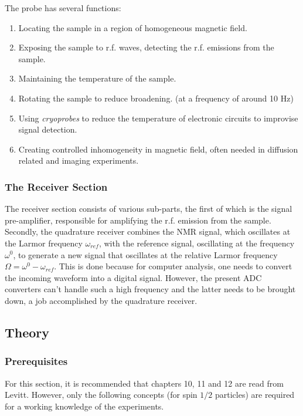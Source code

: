 		The probe has several functions:
		\begin{enumerate}
		\item Locating the sample in a region of homogeneous magnetic field.
		\item Exposing the sample to r.f. waves, detecting the r.f. emissions from
		the sample.
		\item Maintaining the temperature of the sample.
		\item Rotating the sample to reduce broadening. (at a frequency of around
		10 Hz)
		\item Using \emph{cryoprobes} to reduce the temperature of electronic circuits
		to improvise signal detection.
		\item Creating controlled inhomogeneity in magnetic field, often needed
		in diffusion related and imaging experiments.
		\end{enumerate}

		\subsubsection{The Receiver Section}

		The receiver section consists of various sub-parts, the first of which
		is the signal pre-amplifier, responsible for amplifying the r.f. emission
		from the sample. Secondly, the quadrature receiver combines the NMR
		signal, which oscillates at the Larmor frequency $\omega_{ref}$,
		with the reference signal, oscillating at the frequency $\omega^{0}$,
		to generate a new signal that oscillates at the relative Larmor frequency
		$\Omega=\omega^{0}-\omega_{ref}$. This is done because for computer
		analysis, one needs to convert the incoming waveform into a digital
		signal. However, the present ADC converters can't handle such a high
		frequency and the latter needs to be brought down, a job accomplished
		by the quadrature receiver. 


	\subsection{Theory}
		\subsubsection{Prerequisites}
			For this section, it is recommended that chapters 10, 11 and 12 are read from Levitt. However, only the following concepts (for spin $1/2$ particles) are required for a working knowledge of the experiments.

